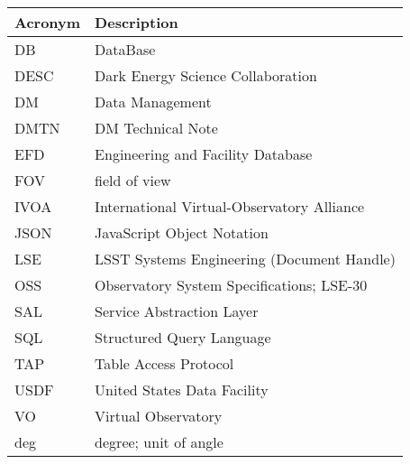 \addtocounter{table}{-1}
\begin{longtable}{p{}p{}}\hline
\textbf{Acronym} & \textbf{Description}  \\\hline

DB & DataBase \\\hline
DESC & Dark Energy Science Collaboration \\\hline
DM & Data Management \\\hline
DMTN & DM Technical Note \\\hline
EFD & Engineering and Facility Database \\\hline
FOV & field of view \\\hline
IVOA & International Virtual-Observatory Alliance \\\hline
JSON & JavaScript Object Notation \\\hline
LSE & LSST Systems Engineering (Document Handle) \\\hline
OSS & Observatory System Specifications; LSE-30 \\\hline
SAL & Service Abstraction Layer \\\hline
SQL & Structured Query Language \\\hline
TAP & Table Access Protocol \\\hline
USDF & United States Data Facility \\\hline
VO & Virtual Observatory \\\hline
deg & degree; unit of angle \\\hline
\end{longtable}
